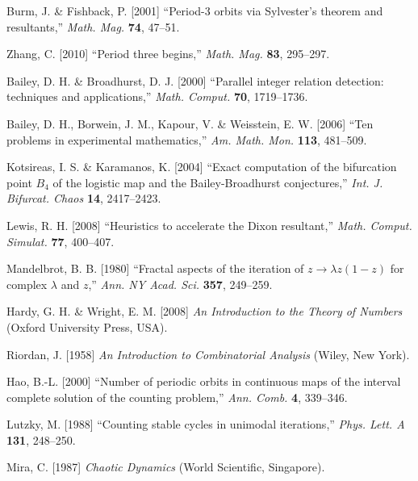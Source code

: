 \documentclass{ws-ijbc}
\begin{document}
\begin{thebibliography}{50}
  Burm, J. \& Fishback, P. [2001]
  ``Period-3 orbits via Sylvester's theorem and resultants,''
  {\it Math. Mag.}
  \textbf{74},
  47--51.

  Zhang, C. [2010]
  ``Period three begins,''
  {\it Math. Mag.}
  \textbf{83},
  295--297.

  Bailey, D. H. \& Broadhurst, D. J. [2000]
  ``Parallel integer relation detection: techniques and applications,''
  {\it Math. Comput.}
  \textbf{70},
  1719--1736.

  Bailey, D. H., Borwein, J. M., Kapour, V. \& Weisstein, E. W. [2006]
  ``Ten problems in experimental mathematics,''
  {\it Am. Math. Mon.}
  \textbf{113},
  481--509.

  Kotsireas, I. S. \& Karamanos, K. [2004]
  ``Exact computation of the bifurcation point $B_4$ of the logistic map
  and  the Bailey-Broadhurst conjectures,''
  {\it Int. J. Bifurcat. Chaos}
  \textbf{14},
  2417--2423.

  Lewis, R. H. [2008]
  ``Heuristics to accelerate the Dixon resultant,''
  {\it Math. Comput. Simulat.}
  \textbf{77},
  400--407.

  Mandelbrot, B. B. [1980]
  ``Fractal aspects of the iteration of $z \rightarrow \lambda z(1-z)$
      for complex $\lambda$ and $z$,''
  {\it Ann. NY Acad. Sci.}
  \textbf{357},
  249--259.

  Hardy, G. H. \& Wright, E. M. [2008]
  {\it An Introduction to the Theory of Numbers}
  (Oxford University Press, USA).

  Riordan, J. [1958]
  {\it An Introduction to Combinatorial Analysis}
  (Wiley, New York).

  Hao, B.-L. [2000]
  ``Number of periodic orbits in continuous maps of
  the interval complete solution of the counting problem,''
  {\it Ann. Comb.}
  \textbf{4},
  339--346.

  Lutzky, M. [1988]
  ``Counting stable cycles in unimodal iterations,''
  {\it Phys. Lett. A}
  \textbf{131},
  248--250.

  Mira, C. [1987]
  {\it Chaotic Dynamics}
  (World Scientific, Singapore).


\end{thebibliography}
\end{document}
